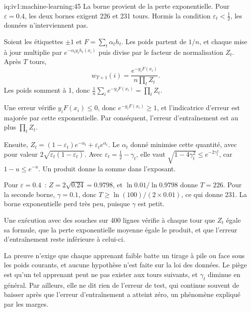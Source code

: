 \begin{solution}{iq:iv1:machine-learning:45}
La borne provient de la perte exponentielle. Pour $\varepsilon = 0.4$, les deux bornes exigent 226 et 231 tours. Hormis la condition $\varepsilon_t < \frac12$, les données n'interviennent pas.

Soient les étiquettes $\pm 1$ et $F = \sum_t\alpha_th_t$. Les poids partent de $1/n$, et chaque mise à jour multiplie par $e^{-\alpha_ty_ih_t(x_i)}$ puis divise par le facteur de normalisation $Z_t$. Après $T$ tours,
\[
w_{T + 1}(i) = \frac{e^{-y_iF(x_i)}}{n\prod_tZ_t}.
\]
Les poids somment à 1, donc $\frac1n\sum_ie^{-y_iF(x_i)} = \prod_tZ_t$.

Une erreur vérifie $y_iF(x_i) \le 0$, donc $e^{-y_iF(x_i)} \ge 1$, et l'indicatrice d'erreur est majorée par cette exponentielle. Par conséquent, l'erreur d'entraînement est au plus $\prod_tZ_t$.

Ensuite, $Z_t = (1 - \varepsilon_t)e^{-\alpha_t} + \varepsilon_te^{\alpha_t}$. Le $\alpha_t$ donné minimise cette quantité, avec pour valeur $2\sqrt{\varepsilon_t(1 - \varepsilon_t)}$. Avec $\varepsilon_t = \frac12 - \gamma_t$, elle vaut $\sqrt{1 - 4\gamma_t^2} \le e^{-2\gamma_t^2}$, car $1 - u \le e^{-u}$. Un produit donne la somme dans l'exposant.

Pour $\varepsilon = 0.4$~: $Z = 2\sqrt{0.24} = 0.9798$, et $\ln 0.01/\ln 0.9798$ donne $T = 226$. Pour la seconde borne, $\gamma = 0.1$, donc $T \ge \ln(100)/(2 \times 0.01)$, ce qui donne 231. La borne exponentielle perd très peu, puisque $\gamma$ est petit.

Une exécution avec des souches sur 400 lignes vérifie à chaque tour que $Z_t$ égale sa formule, que la perte exponentielle moyenne égale le produit, et que l'erreur d'entraînement reste inférieure à celui-ci.

La preuve n'exige que chaque apprenant faible batte un tirage à pile ou face sous les poids courants, et aucune hypothèse n'est faite sur la loi des données. Le piège est qu'un tel apprenant peut ne pas exister aux tours suivants, et $\gamma_t$ diminue en général. Par ailleurs, elle ne dit rien de l'erreur de test, qui continue souvent de baisser après que l'erreur d'entraînement a atteint zéro, un phénomène expliqué par les marges.



\end{solution}
